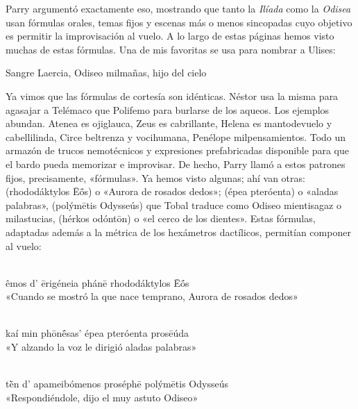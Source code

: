 Parry argumentó exactamente eso, mostrando que tanto la \emph{Ilíada} como la \emph{Odisea} usan fórmulas orales, temas fijos y escenas más o menos sincopadas cuyo objetivo es permitir la improvisación al vuelo. A lo largo de estas páginas hemos visto muchas de estas fórmulas. Una de mis favoritas se usa para nombrar a Ulises:

\begin{versocita}
Sangre Laercia, Odiseo milmañas, hijo del cielo
\end{versocita}

Ya vimos que las fórmulas de cortesía son idénticas. Néstor usa la misma para agasajar a Telémaco que Polifemo para burlarse de los aqueos. Los ejemplos abundan. Atenea es ojiglauca, Zeus es cabrillante, Helena es mantodevuelo y cabellilinda, Circe beltrenza y vocihumana, Penélope milpensamientos. Todo un armazón de trucos nemotécnicos y expresiones prefabricadas disponible para que el bardo pueda memorizar e improvisar. De hecho, Parry llamó a estos patrones fijos, precisamente, «fórmulas». Ya hemos visto algunas; ahí van otras:  (rhododáktylos Ēṓs) o «Aurora de rosados dedos»;  (épea pteróenta) o «aladas palabras»,  (polýmētis Odysseús) que Tobal traduce como Odiseo mientisagaz o milastucias,  (hérkos odóntōn) o «el cerco de los dientes». Estas fórmulas, adaptadas además a la métrica de los hexámetros dactílicos, permitían componer al vuelo:

\begin{versocita}
\\
êmos d' ērigéneia phánē rhododáktylos Ēṓs\\
«Cuando se mostró la que nace temprano, Aurora de rosados dedos»
\end{versocita}

\begin{versocita}
\\
kaí min phōnḗsas' épea pteróenta prosēúda\\
«Y alzando la voz le dirigió aladas palabras»
\end{versocita}

\begin{versocita}
\\
tḕn d' apameibómenos proséphē polýmētis Odysseús\\
«Respondiéndole, dijo el muy astuto Odiseo»
\end{versocita}

